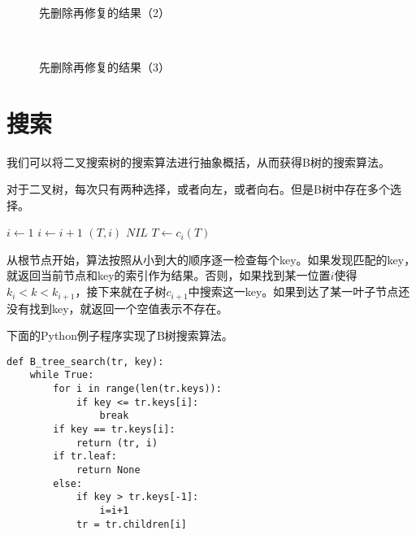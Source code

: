 \documentclass[UTF8]{article}
\begin{document}
\begin{figure}[htbp]
  \centering
   \\
  \caption{先删除再修复的结果（2）} \label{fig:result-del-fp2}
\end{figure}

\begin{figure}[htbp]
  \centering
   \\
  \caption{先删除再修复的结果（3）} \label{fig:result-del-fp3}
\end{figure}


\section{搜索}

我们可以将二叉搜索树的搜索算法进行抽象概括，从而获得B树的搜索算法。

对于二叉树，每次只有两种选择，或者向左，或者向右。但是B树中存在多个选择。

\begin{algorithmic}[1]
  \Loop
    \State $i \gets 1$
      \State $i \gets i+1$
    \EndWhile
      \State \Return $(T, i)$
    \EndIf
      \State \Return $NIL$ 
    \Else
      \State $T \gets c_i(T)$
    \EndIf
  \EndLoop
\EndFunction
\end{algorithmic}

从根节点开始，算法按照从小到大的顺序逐一检查每个key。如果发现匹配的key，就返回当前节点和key的索引作为结果。否则，如果找到某一位置$i$使得$k_i < k < k_{i+1}$，接下来就在子树$c_{i+1}$中搜索这一key。如果到达了某一叶子节点还没有找到key，就返回一个空值表示不存在。

下面的Python例子程序实现了B树搜索算法。

\lstset{language=Python}
\begin{lstlisting}
def B_tree_search(tr, key):
    while True:
        for i in range(len(tr.keys)):
            if key <= tr.keys[i]:
                break
        if key == tr.keys[i]:
            return (tr, i)
        if tr.leaf:
            return None
        else:
            if key > tr.keys[-1]:
                i=i+1
            tr = tr.children[i]
\end{lstlisting}
\end{document}
